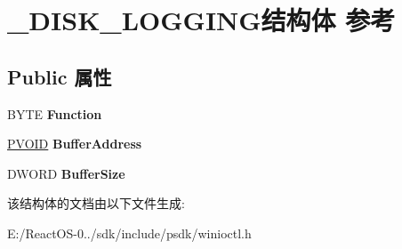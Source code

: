 \hypertarget{struct___d_i_s_k___l_o_g_g_i_n_g}{}\section{\+\_\+\+D\+I\+S\+K\+\_\+\+L\+O\+G\+G\+I\+N\+G结构体 参考}
\label{struct___d_i_s_k___l_o_g_g_i_n_g}
\subsection*{Public 属性}
\begin{DoxyCompactItemize}
\item 
\mbox{\label{struct___d_i_s_k___l_o_g_g_i_n_g_a3d95db7db2c1d61cb5eff564e44ca29d}} 
B\+Y\+TE {\bfseries Function}
\item 
\mbox{\label{struct___d_i_s_k___l_o_g_g_i_n_g_aabef518911813b04f92f0212d61800ab}} 
\hyperlink{interfacevoid}{P\+V\+O\+ID} {\bfseries Buffer\+Address}
\item 
\mbox{\label{struct___d_i_s_k___l_o_g_g_i_n_g_a311276192d3bd552e0a163e2c54ec395}} 
D\+W\+O\+RD {\bfseries Buffer\+Size}
\end{DoxyCompactItemize}


该结构体的文档由以下文件生成\+:\begin{DoxyCompactItemize}
\item 
E\+:/\+React\+O\+S-\/0../sdk/include/psdk/winioctl.\+h\end{DoxyCompactItemize}
